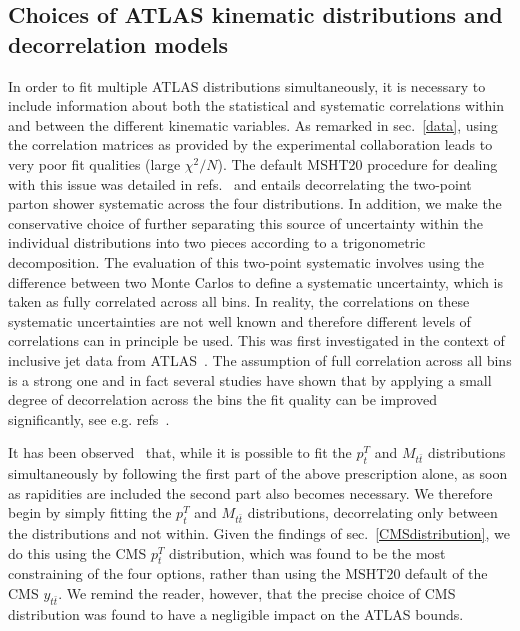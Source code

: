 \documentclass[sn-mathphys]{sn-jnl}%
\newcommand{\pT}{p^T_t}
\newcommand{\mtt}{M_{t\bar{t}}}
\newcommand{\ytt}{y_{t\bar{t}}}
\begin{document}
\subsection{Choices of ATLAS kinematic distributions and decorrelation models}
In order to fit multiple ATLAS distributions simultaneously, it is necessary to include information about both the statistical and systematic correlations within and between the different kinematic variables. As remarked in sec.~\ref{data}, using the correlation matrices as provided by the experimental collaboration leads to very poor fit qualities (large $\chi^2/N$). The default MSHT20 procedure for dealing with this issue was detailed in refs.~\cite{Bailey:2019yze,Bailey:2020ooq} and entails decorrelating the two-point parton shower systematic across the four distributions. In addition, we make the conservative choice of further separating this source of uncertainty within the individual distributions into two pieces according to a trigonometric decomposition. The evaluation of this two-point systematic involves using the difference between two Monte Carlos to define a systematic uncertainty, which is taken as fully correlated across all bins. In reality, the correlations on these systematic uncertainties are not well known and therefore different levels of correlations can in principle be used. This was first investigated in the context of inclusive jet data from ATLAS~\cite{ATLAS:2017kux}. The assumption of full correlation across all bins is a strong one and in fact several studies have shown that by applying a small degree of decorrelation across the bins the fit quality can be improved significantly, see e.g. refs~\cite{Bailey:2019yze,Bailey:2020ooq}.

It has been observed~\cite{Bailey:2019yze,Hou:2019gfw,Amat:2019upj,Kadir:2020yml,Amoroso:2022eow} that, while it is possible to fit the $\pT$ and $\mtt$ distributions simultaneously by following the first part of the above prescription alone, as soon as rapidities are included the second part also becomes necessary. We therefore begin by simply fitting the $\pT$ and $\mtt$ distributions, decorrelating only between the distributions and not within. Given the findings of sec.~\ref{CMSdistribution}, we do this using the CMS $\pT$ distribution, which was found to be the most constraining of the four options, rather than using the MSHT20 default of the CMS $\ytt$. We remind the reader, however, that the precise choice of CMS distribution was found to have a negligible impact on the ATLAS bounds.
\end{document}
